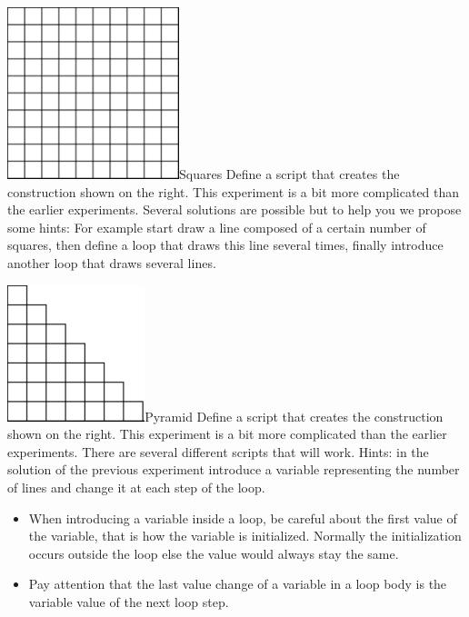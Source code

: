 \begin{exofigwithsizeandtitle}[0.35]{\includegraphics[width=5cm]{damier}}{Squares}\label{exo:spiralsimple}
Define a script that creates the construction shown on the right. This experiment is a bit more complicated than the earlier experiments. Several solutions are possible but to help you we propose some hints: For example start draw a line composed of a certain number of squares, then define a loop that draws this line several times, finally introduce another loop that draws several lines. 
\end{exofigwithsizeandtitle}

\begin{exofigwithsizeandtitle}[0.35]{\includegraphics[width=4cm]{cubesandpyramid}}{Pyramid}\label{exo:spiralsimple}
Define a script that creates the construction shown on the right. This experiment is  a bit more complicated than the earlier experiments.  There are several different scripts that will work. Hints: in the solution of the previous experiment introduce a variable representing the number of lines and change it at each step of the loop. 
\end{exofigwithsizeandtitle}



\summa

\begin{itemize}
\item When introducing a variable inside a loop, be careful about the first value of the variable, that is how the variable is initialized. Normally the initialization occurs outside the loop else the value would always stay the same. 
\item Pay attention that the last value change of a variable in a loop body is the variable value of the next loop step.
\end{itemize}

\ifx\wholebook\relax\else
\fi
